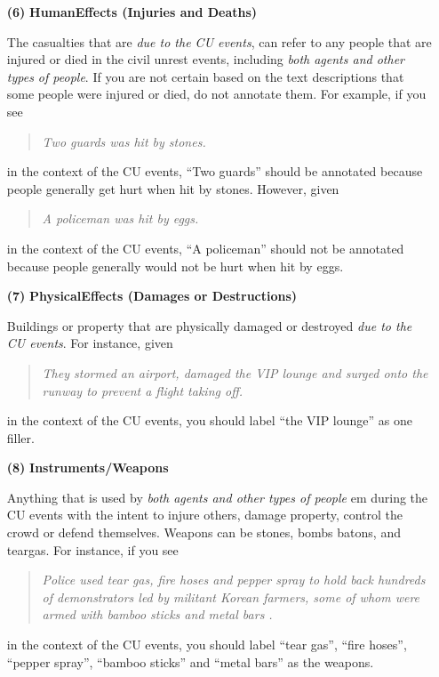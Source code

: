 \begin{enumerate}
\item[{\bf (6)}] {\bf HumanEffects (Injuries and Deaths)}

The casualties that are {\em due to the CU events}, 
can refer to any people that are injured or died in the civil unrest events, including 
{\em both agents and other types of people}. If you are not certain based on the text descriptions 
that some people were injured or died, do not annotate them. 
For example, if you see 
  \begin{quote}
   {\em Two guards was hit by stones.}
  \end{quote}
in the context of the CU events, 
 ``Two guards'' should be annotated because people generally get hurt when hit by stones.
 However, given 
   \begin{quote}
    {\em A policeman was hit by eggs.}
   \end{quote}
in the context of the CU events, 
``A policeman'' should not be annotated because people generally would not be hurt when hit by eggs.

\item[{\bf (7)}] {\bf PhysicalEffects (Damages or Destructions)} 

Buildings or property that are physically 
damaged or destroyed {\em due to the CU events}. 
For instance, given 
\begin{quote}
 {\em They stormed an airport, damaged the VIP lounge and surged 
 onto the runway to prevent a flight taking off.}
\end{quote}
in the context of the CU events, 
 you should label ``the VIP lounge'' as one filler. 

\item[{\bf (8)}] {\bf Instruments/Weapons} 

Anything that is used by {\em both agents and other types of people} 
{em during the CU events} with the intent to injure others, damage property, control the 
crowd or defend themselves. Weapons can be stones, bombs batons, and teargas. 
For instance, if you see 
\begin{quote}
 {\em Police used tear gas, fire hoses and pepper spray to 
 hold back hundreds of demonstrators led by militant Korean farmers, some of whom were 
 armed with bamboo sticks and metal bars .}
\end{quote}
 in the context of the CU events, 
 you should label ``tear gas'', ``fire hoses'', ``pepper spray'', ``bamboo sticks'' 
 and ``metal bars'' as the weapons. 
 \end{enumerate}

